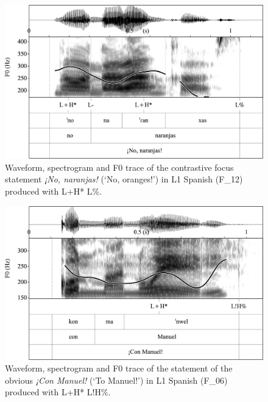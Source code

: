\begin{figure}


\includegraphics[width=\textwidth]{figures/Figure_4.24.png}


\caption{Waveform, spectrogram and F0 trace of the contrastive focus statement \textit{¡No, naranjas!} (‘No, oranges!’) in L1 Spanish \mbox{(F\_12)} produced with L+H* L\%.}
\label{fig:4.24}
\end{figure}

\begin{figure}


\includegraphics[width=\textwidth]{figures/Figure_4.25.png}


\caption{Waveform, spectrogram and F0 trace of the statement of the obvious \textit{¡Con Manuel!} (‘To Manuel!’) in L1 Spanish \mbox{(F\_06)} produced with L+H* L!H\%.}
\label{fig:4.25}
\end{figure}


